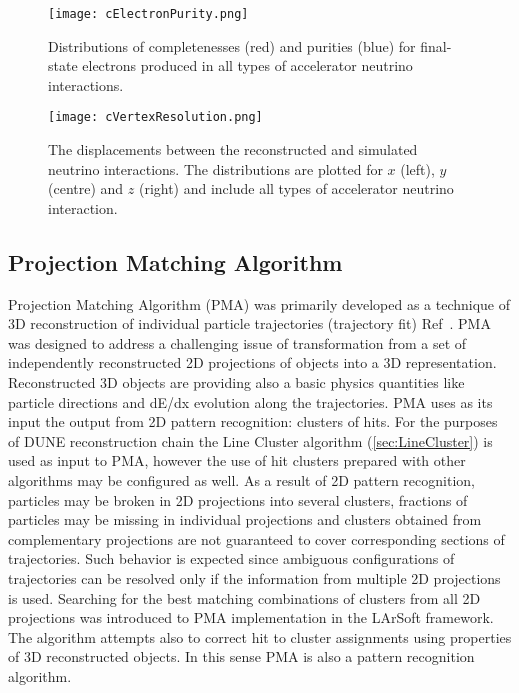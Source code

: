 \begin{figure}[!ht]
\centering
\texttt{[image: cElectronPurity.png]}
\caption{Distributions of completenesses (red) and purities (blue) for final-state electrons produced in all types of accelerator neutrino interactions.}
\label{pandora_electron_performance}
\end{figure}

\begin{figure}[!ht]
\centering
\texttt{[image: cVertexResolution.png]}
\caption{The displacements between the reconstructed and simulated neutrino interactions. The distributions are plotted for $x$ (left), $y$ (centre) and $z$ (right) and include all types of accelerator neutrino interaction.}
\label{pandora_vertex_resolution}
\end{figure}


\subsection{Projection Matching Algorithm}\label{sec:PMA}
Projection Matching Algorithm (PMA) was primarily developed as a technique of 3D reconstruction of individual particle trajectories (trajectory fit) Ref~\cite{Antonello:2012hu}. PMA was designed to address a challenging issue of transformation from a set of independently reconstructed 2D projections of objects into a 3D representation. Reconstructed 3D objects are providing also a basic physics quantities like particle directions and dE/dx evolution along the trajectories. PMA uses as its input the output from 2D pattern recognition: clusters of hits. For the purposes of DUNE reconstruction chain the Line Cluster algorithm (\ref{sec:LineCluster}) is used as input to PMA, however the use of hit clusters prepared with other algorithms may be configured as well. As a result of 2D pattern recognition, particles may be broken in 2D projections into several clusters, fractions of particles may be missing in individual projections and clusters obtained from complementary projections are not guaranteed to cover corresponding sections of trajectories. Such behavior is expected since ambiguous configurations of trajectories can be resolved only if the information from multiple 2D projections is used. Searching for the best matching combinations of clusters from all 2D projections was introduced to PMA implementation in the LArSoft framework. The algorithm attempts also to correct hit to cluster assignments using properties of 3D reconstructed objects. In this sense PMA is also a pattern recognition algorithm.

